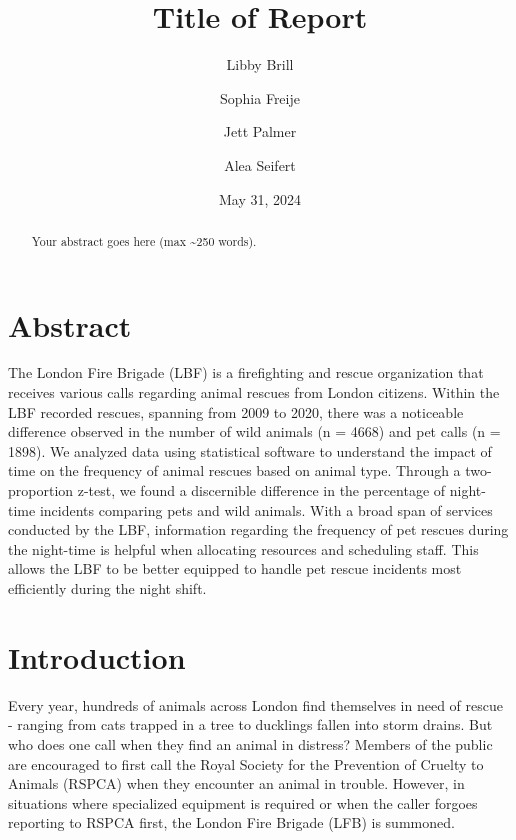 \documentclass[
]{article}
\title{Title of Report}
\author[1]{Libby Brill}
\author[1]{Sophia Freije}
\author[1]{Jett Palmer}
\author[1]{Alea Seifert}
\affil[1]{Department of Statistics, Cal Poly - SLO}
\date{May 31, 2024}
\begin{document}
\maketitle
\begin{abstract}
Your abstract goes here (max \textasciitilde250 words).
\end{abstract}
\ifdefined\Shaded\renewenvironment{Shaded}{\begin{tcolorbox}[borderline west={3pt}{0pt}{shadecolor}, sharp corners, breakable, boxrule=0pt, enhanced, frame hidden, interior hidden]}{\end{tcolorbox}}\fi

\hypertarget{abstract}{%
\section{Abstract}\label{abstract}}

The London Fire Brigade (LBF) is a firefighting and rescue organization
that receives various calls regarding animal rescues from London
citizens. Within the LBF recorded rescues, spanning from 2009 to 2020,
there was a noticeable difference observed in the number of wild animals
(n = 4668) and pet calls (n = 1898). We analyzed data using statistical
software to understand the impact of time on the frequency of animal
rescues based on animal type. Through a two-proportion z-test, we found
a discernible difference in the percentage of night-time incidents
comparing pets and wild animals. With a broad span of services conducted
by the LBF, information regarding the frequency of pet rescues during
the night-time is helpful when allocating resources and scheduling
staff. This allows the LBF to be better equipped to handle pet rescue
incidents most efficiently during the night shift.

\hypertarget{intro}{%
\section{Introduction}\label{intro}}

Every year, hundreds of animals across London find themselves in need of
rescue - ranging from cats trapped in a tree to ducklings fallen into
storm drains. But who does one call when they find an animal in
distress? Members of the public are encouraged to first call the Royal
Society for the Prevention of Cruelty to Animals (RSPCA) when they
encounter an animal in trouble. However, in situations where specialized
equipment is required or when the caller forgoes reporting to RSPCA
first, the London Fire Brigade (LFB) is summoned.
\end{document}
